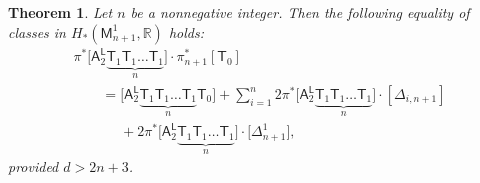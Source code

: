 \documentclass[pdftex]{sigma}
\numberwithin{equation}{section}
\newtheorem{thm}{Theorem}[section]
\begin{document}
\begin{thm}
\label{theorem_for_many_tks_ag_pakL_A2}
Let $n$ be a nonnegative integer.
Then the following equality of classes in $H_*(\mathsf{M}_{{n+1}}^1, \mathbb{R})$ holds:
\begin{gather}
\pi^{\ast}\bigl[\mathsf{A}_2^{\mathsf{L}} \underbrace{\mathsf{T}_{1}\mathsf{T}_{1} \dots \mathsf{T}_{1}}_{n}\bigr]\cdot
\pi_{n+1}^{\ast}[\mathsf{T}_0] \nonumber\\[-1mm]
 \qquad =
\bigl[\mathsf{A}_2^{\mathsf{L}} \underbrace{\mathsf{T}_{1}\mathsf{T}_{1} \dots \mathsf{T}_{1}}_{n} \mathsf{T}_{0}\bigr]
 + \sum_{i=1}^{n} 2 \pi^{\ast}\bigl[\mathsf{A}_2^{\mathsf{L}} \underbrace{\mathsf{T}_{1}\mathsf{T}_{1} \dots \mathsf{T}_{1}}_{n}\bigr] \cdot [\Delta_{i, {n+1}}] \nonumber \\
\phantom{ \qquad =}{} + 2 \pi^{\ast} \bigl[\mathsf{A}_2^{\mathsf{L}} \underbrace{\mathsf{T}_{1}\mathsf{T}_{1} \dots \mathsf{T}_{1}}_{n}\bigr] \cdot
\bigl[\Delta_{{n+1}}^1\bigr],\label{many_tks_ag_pakL_A2}
\end{gather}
provided $d > 2n+3$.
\end{thm}
\end{document}

